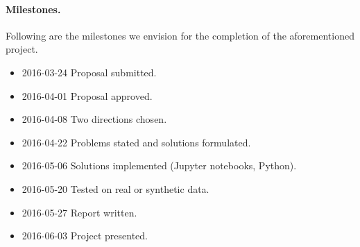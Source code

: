 \documentclass[a4paper,11pt]{article}
\begin{document}
\paragraph{Milestones.}
Following are the milestones we envision for the completion of the
aforementioned project.
\begin{itemize}
	\setlength{\itemsep}{0pt} \setlength{\parskip}{0pt}
	\item 2016-03-24 Proposal submitted.
	\item 2016-04-01 Proposal approved.
	\item 2016-04-08 Two directions chosen.
	\item 2016-04-22 Problems stated and solutions formulated.
	\item 2016-05-06 Solutions implemented (Jupyter notebooks, Python).
	\item 2016-05-20 Tested on real or synthetic data.
	\item 2016-05-27 Report written.
	\item 2016-06-03 Project presented.
\end{itemize}

\printbibliography
\end{document}
